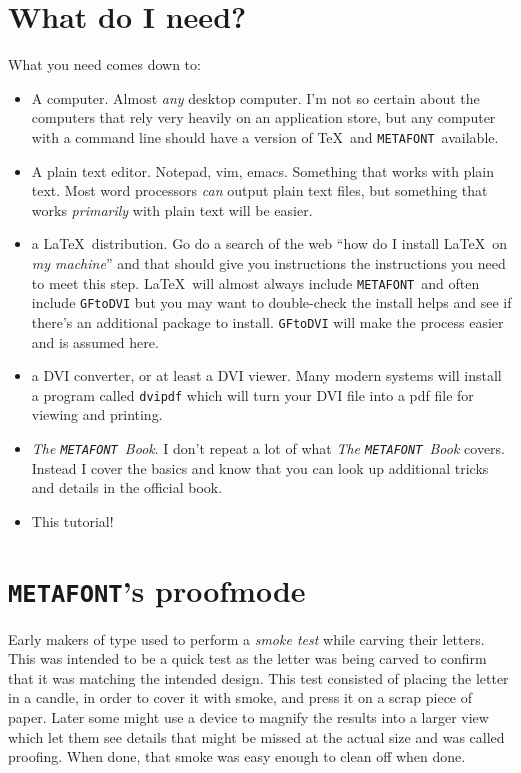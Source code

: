 \documentclass[a4paper,11pt,twoside]{book}
\newcommand{\MF}{{\tt METAFONT}}
\begin{document}
\section{What do I need?}

What you need comes down to:
\begin{itemize}
\item A computer.
Almost \emph{any} desktop computer.
I'm not so certain about the computers that rely very heavily on an application store, but any
computer with a command line should have a version of \TeX\ and \MF\ available.
\item A plain text editor.
Notepad, vim, emacs.
Something that works with plain text.
Most word processors \emph{can} output plain text files, but something that works \emph{primarily}
with plain text will be easier.
\item a \LaTeX\ distribution.
Go do a search of the web ``how do I install \LaTeX\ on \emph{my machine}'' and that should give
you instructions the instructions you need to meet this step.
\LaTeX\ will almost always include \MF\ and often include \texttt{GFtoDVI} but you may want to
double-check the install helps and see if there's an additional package to install.
\texttt{GFtoDVI} will make the process easier and is assumed here.
\item a DVI converter, or at least a DVI viewer.
Many modern systems will install a program called \texttt{dvipdf} which will turn your DVI file
into a pdf file for viewing and printing.
\item \textsl{The \MF\ Book}.
I don't repeat a lot of what \textsl{The \MF\ Book} covers.
Instead I cover the basics and know that you can look up additional tricks and details in the
official book.
\item This tutorial!
\end{itemize}

\section{\MF's proofmode}

Early makers of type used to perform a \emph{smoke test} while carving their letters.
This was intended to be a quick test as the letter was being carved to confirm that it was
matching the intended design.
This test consisted of placing the letter in a candle, in order to cover it with smoke, and press
it on a scrap piece of paper.
Later some might use a device to magnify the results into a larger view which let them see details
that might be missed at the actual size and was called proofing.
When done, that smoke was easy enough to clean off when done.
\end{document}
